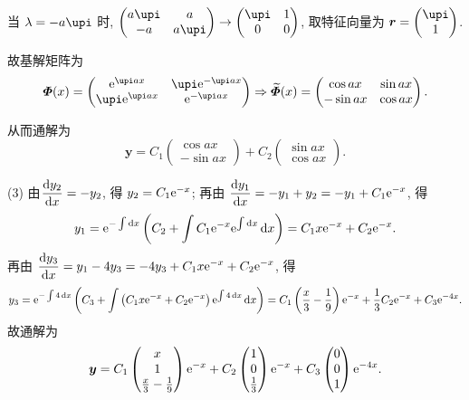 \begin{solution}
  当 $\lambda=-a\upi$ 时, $\begin{pmatrix}a\upi&a\\-a&a\upi\end{pmatrix}\to\begin{pmatrix}\upi&1\\0&0\end{pmatrix}$, 
  取特征向量为 $\bm{r}=\begin{pmatrix}\upi\\1\end{pmatrix}$.

  故基解矩阵为
  \[\bmitPhi(x)=\begin{pmatrix}\e^{\upi ax}&\upi\e^{-\upi ax}\\\upi\e^{\upi ax}&\e^{-\upi ax}\end{pmatrix}
  \Rightarrow\widetilde{\bmitPhi}(x)=\begin{pmatrix}\cos ax&\sin ax\\-\sin ax&\cos ax\end{pmatrix}.\]

  从而通解为
  \[\bm{y}=C_1\begin{pmatrix}\cos ax\\-\sin ax\end{pmatrix}
    + C_2\begin{pmatrix}\sin ax\\\cos ax\end{pmatrix}.\]

  (3) 由$\displaystyle\frac{\mathop{}\!\mathrm{d} y_2}{\mathop{}\!\mathrm{d} x}=-y_2$, 得 $y_2=C_1\mathrm{e}^{-x}$; 
  再由 $\displaystyle\frac{\mathop{}\!\mathrm{d} y_1}{\mathop{}\!\mathrm{d} x}=-y_1+y_2=-y_1+C_1\mathrm{e}^{-x}$, 得
  \[\displaystyle y_1=\mathrm{e}^{-\int\mathop{}\!\mathrm{d} x}\left(C_2+\int C_1\mathrm{e}^{-x}\mathrm{e}^{\int\mathop{}\!\mathrm{d} x}\mathop{}\!\mathrm{d} x\right)
    = C_1x\mathrm{e}^{-x}+C_2\mathrm{e}^{-x}.\]
  再由 $\displaystyle\frac{\mathop{}\!\mathrm{d} y_3}{\mathop{}\!\mathrm{d} x}=y_1-4y_3=-4y_3+C_1x\mathrm{e}^{-x}+C_2\mathrm{e}^{-x}$, 得
  \[\displaystyle y_3=\mathrm{e}^{-\int4\mathop{}\!\mathrm{d} x}\left(C_3+\int\left(C_1x\mathrm{e}^{-x}+C_2\mathrm{e}^{-x}\right)
    \mathrm{e}^{\int4\mathop{}\!\mathrm{d} x}\mathop{}\!\mathrm{d} x\right)=C_1\left(\frac{x}{3}-\frac{1}{9}\right)\mathrm{e}^{-x}
    +\frac{1}{3}C_2\mathrm{e}^{-x}+C_3\mathrm{e}^{-4x}.\]
  故通解为
  \[\bm{y}=C_1\begin{pmatrix}x\\1\\\frac{x}{3}-\frac{1}{9}\end{pmatrix}\mathrm{e}^{-x}+C_2
    \begin{pmatrix}1\\0\\\frac{1}{3}\end{pmatrix}\mathrm{e}^{-x}
    +C_3\begin{pmatrix}0\\0\\1\end{pmatrix}\mathrm{e}^{-4x}.\]


\end{solution}

